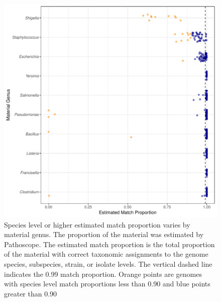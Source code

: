 \documentclass[fleqn,10pt,lineno]{wlpeerj}\usepackage[]{graphicx}\usepackage[]{color}
\makeatletter
\def\maxwidth{ %
  \ifdim\Gin@nat@width>\linewidth
    \linewidth
  \else
    \Gin@nat@width
  \fi
}
\newenvironment{knitrout}{}{} %
\makeatother
\begin{document}
\begin{knitrout}
\color{fgcolor}\begin{figure}
\includegraphics[width=\maxwidth]{figure/species_prop-1} \caption[Species level or higher estimated match proportion varies by material genus]{Species level or higher estimated match proportion varies by material genus. The proportion of the material was estimated by Pathoscope. The estimated match proportion is the total proportion of the material with correct taxonomic assignments to the genome species, subspecies, strain, or isolate levels. The vertical dashed line indicates the 0.99 match proportion. Orange points are genomes with species level match proportions less than 0.90 and blue points greater than 0.90}\label{fig:species_prop}
\end{figure}


\end{knitrout}
\end{document}
